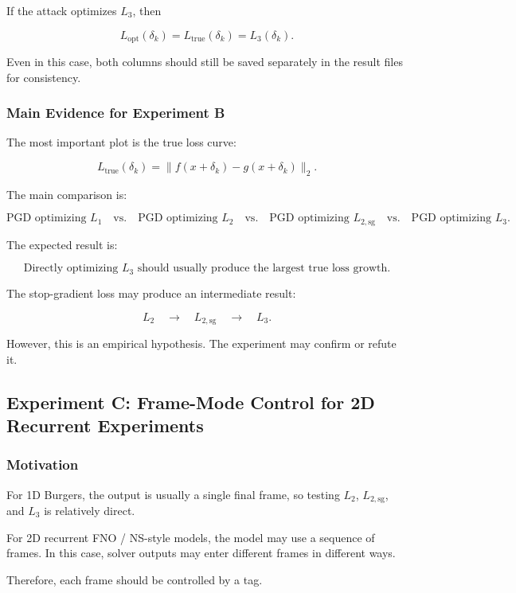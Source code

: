 \documentclass{article}
\begin{document}
If the attack optimizes \(L_3\), then

\[
L_{\mathrm{opt}}(\delta_k)
=
L_{\mathrm{true}}(\delta_k)
=
L_3(\delta_k).
\]

Even in this case, both columns should still be saved separately in the result files for consistency.

\subsubsection{Main Evidence for Experiment B}

The most important plot is the true loss curve:

\[
L_{\mathrm{true}}(\delta_k)
=
\|f(x+\delta_k)-g(x+\delta_k)\|_2.
\]

The main comparison is:

\[
\text{PGD optimizing } L_1
\quad
\text{vs.}
\quad
\text{PGD optimizing } L_2
\quad
\text{vs.}
\quad
\text{PGD optimizing } L_{2,\mathrm{sg}}
\quad
\text{vs.}
\quad
\text{PGD optimizing } L_3.
\]

The expected result is:

\[
\text{Directly optimizing } L_3
\text{ should usually produce the largest true loss growth.}
\]

The stop-gradient loss may produce an intermediate result:

\[
L_2
\quad
\longrightarrow
\quad
L_{2,\mathrm{sg}}
\quad
\longrightarrow
\quad
L_3.
\]

However, this is an empirical hypothesis. The experiment may confirm or refute it.

\subsection{Experiment C: Frame-Mode Control for 2D Recurrent Experiments}

\subsubsection{Motivation}

For 1D Burgers, the output is usually a single final frame, so testing \(L_2\), \(L_{2,\mathrm{sg}}\), and \(L_3\) is relatively direct.

For 2D recurrent FNO / NS-style models, the model may use a sequence of frames. In this case, solver outputs may enter different frames in different ways.

Therefore, each frame should be controlled by a tag.
\end{document}
